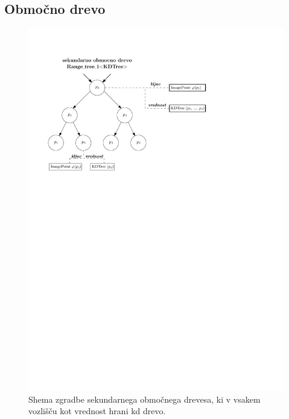 \documentclass[a4paper, 12pt]{book}
\begin{document}
\subsection{Območno drevo}
\begin{figure}
\centerline{\includegraphics[scale=1]{pics/range-dual-kd-2.pdf}}
\caption{Shema zgradbe sekundarnega območnega drevesa, ki v vsakem vozlišču kot vrednost hrani kd drevo.}
\label{range-dual-kd}
\end{figure}
\end{document}
